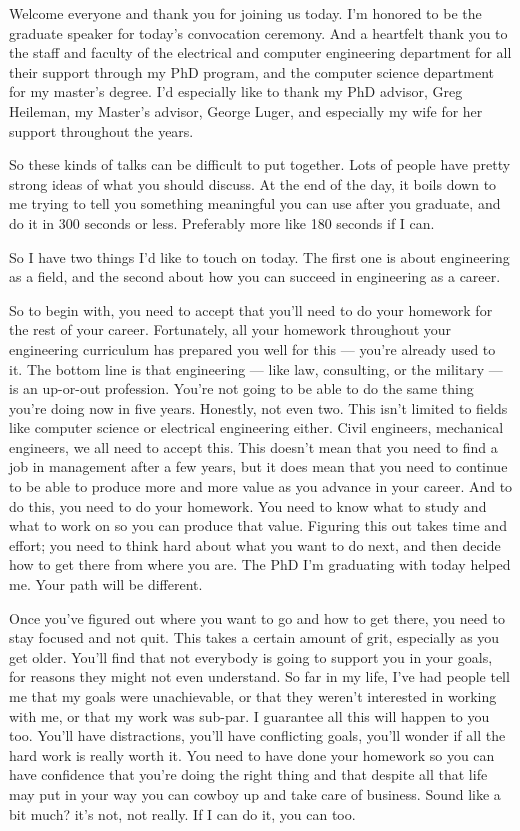 \documentclass[10pt,letterpaper]{letter}
\begin{document}
Welcome everyone and thank you for joining us today.   I'm honored to be the graduate speaker for today's convocation ceremony.  And a heartfelt thank you to the staff and faculty of the electrical and computer engineering department for all their support through my PhD program, and the computer science department for my master's degree.  I'd especially like to thank my PhD advisor, Greg Heileman, my Master's advisor, George Luger, and especially my wife for her support throughout the years.

So these kinds of talks can be difficult to put together.  Lots of people have pretty strong ideas of what you should discuss.  At the end of the day, it boils down to me trying to tell you something meaningful you can use after you graduate, and do it in 300 seconds or less.  Preferably more like 180 seconds if I can.

So I have two things I'd like to touch on today.  The first one is about engineering as a field, and the second about how you can succeed in engineering as a career.

So to begin with, you need to accept that you'll need to do your homework for the rest of your career.  Fortunately, all your homework throughout your engineering curriculum has prepared you well for this --- you're already used to it.  The bottom line is that engineering --- like law, consulting, or the military --- is an up-or-out profession.  You're not going to be able to do the same thing you're doing now in five years. Honestly, not even two.  This isn't limited to fields like computer science or electrical engineering either.  Civil engineers, mechanical engineers, we all need to accept this.  This doesn't mean that you need to find a job in management after a few years, but it does mean that you need to continue to be able to produce more and more value as you advance in your career.  And to do this, you need to do your homework.  You need to know what to study and what to work on so you can produce that value.  Figuring this out takes time and effort; you need to think hard about what you want to do next, and then decide how to get there from where you are.  The PhD I'm graduating with today helped me.  Your path will be different.

Once you've figured out where you want to go and how to get there, you need to stay focused and not quit.  This takes a certain amount of grit, especially as you get older.  You'll find that not everybody is going to support you in your goals, for reasons they might not even understand.  So far in my life, I've had people tell me that my goals were unachievable, or that they weren't interested in working with me, or that my work was sub-par.  I guarantee all this will happen to you too.  You'll have distractions, you'll have conflicting goals, you'll wonder if all the hard work is really worth it.  You need to have done your homework so you can have confidence that you're doing the right thing and that despite all that life may put in your way you can cowboy up and take care of business.  Sound like a bit much? it's not, not really.  If I can do it, you can too.
\end{document}
